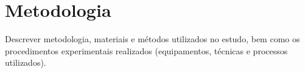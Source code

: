 \chapter{Metodologia}
\label{cap:03}

Descrever metodologia, materiais e métodos utilizados no estudo, bem como os procedimentos experimentais realizados (equipamentos, técnicas e processos utilizados).
